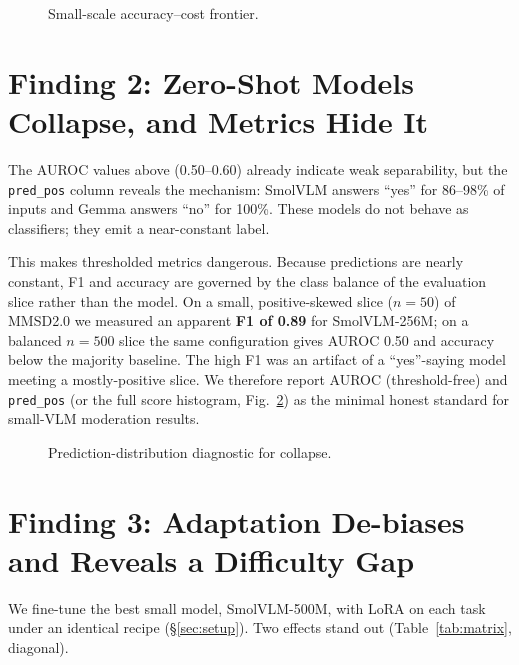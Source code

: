 \documentclass[sigconf,nonacm]{acmart}
\begin{document}
\begin{figure}[t]
\centering
{}
\caption{Small-scale accuracy--cost frontier.}
\label{fig:pareto}
\end{figure}

\section{Finding 2: Zero-Shot Models Collapse, and Metrics Hide It}\label{sec:collapse}
The AUROC values above (0.50--0.60) already indicate weak separability, but the
\texttt{pred\_pos} column reveals the mechanism: SmolVLM answers ``yes'' for 86--98\% of
inputs and Gemma answers ``no'' for 100\%. These models do not behave as classifiers;
they emit a near-constant label.

This makes thresholded metrics dangerous. Because predictions are nearly constant, F1 and
accuracy are governed by the class balance of the evaluation slice rather than the model.
On a small, positive-skewed slice ($n{=}50$) of MMSD2.0 we measured an apparent
\textbf{F1 of 0.89} for SmolVLM-256M; on a balanced $n{=}500$ slice the same configuration
gives AUROC 0.50 and accuracy below the majority baseline. The high F1 was an artifact of
a ``yes''-saying model meeting a mostly-positive slice. We therefore report AUROC
(threshold-free) and \texttt{pred\_pos} (or the full score histogram, Fig.~\ref{fig:hist})
as the minimal honest standard for small-VLM moderation results.

\begin{figure}[t]
\centering
{}
\caption{Prediction-distribution diagnostic for collapse.}
\label{fig:hist}
\end{figure}

\section{Finding 3: Adaptation De-biases and Reveals a Difficulty Gap}\label{sec:adapt}
We fine-tune the best small model, SmolVLM-500M, with LoRA on each task under an identical
recipe (\S\ref{sec:setup}). Two effects stand out (Table~\ref{tab:matrix}, diagonal).
\end{document}
